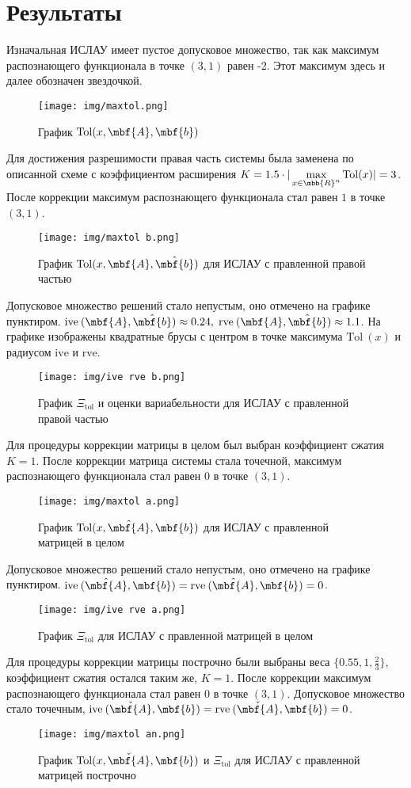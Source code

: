 \documentclass[a4paper]{article}
\begin{document}
\section{Результаты}
Изначальная ИСЛАУ имеет пустое допусковое множество, так как максимум распознающего функционала в точке $(3,1)$ равен -2. Этот максимум здесь и далее обозначен звездочкой.
\begin{figure}[H]
    \centering
    \texttt{[image: img/maxtol.png]}
    \caption{График $\mathrm{Tol}(x,\mbf{A},\mbf{b})$}
    \label{fig:origtol}
\end{figure}
Для достижения разрешимости правая часть системы была заменена по описанной схеме с коэффициентом расширения  $K=1.5\cdot|\max\limits_{x\in\mbb{R}^n}\mathrm{Tol}(x)|=3$. После коррекции максимум распознающего функционала стал равен $1$ в точке $(3,1)$.
\begin{figure}[H]
    \centering
    \texttt{[image: img/maxtol b.png]}
    \caption{График $\mathrm{Tol}(x,\mbf{A}, \hat{\mbf{b}})$ для ИСЛАУ с правленной правой частью}
    \label{fig:btol}
\end{figure}
Допусковое множество решений стало непустым, оно отмечено на графике пунктиром. $\mathrm{ive}\:(\mbf{A}, \hat{\mbf{b}})\approx0.24,\;\mathrm{rve}\:(\mbf{A}, \hat{\mbf{b}})\approx1.1$. На графике изображены квадратные брусы с центром в точке максимума $\mathrm{Tol}\:(x)$ и радиусом $\mathrm{ive}$ и $\mathrm{rve}$.
\begin{figure}[H]
    \centering
    \texttt{[image: img/ive rve b.png]}
    \caption{График $\Xi_{\mathrm{tol}}$ и оценки вариабельности для ИСЛАУ с правленной правой частью}
    \label{fig:biverve}
\end{figure}
Для процедуры коррекции матрицы в целом был выбран коэффициент сжатия $K=1$. После коррекции матрица системы стала точечной, максимум распознающего функционала стал равен $0$ в точке $(3,1)$.
\begin{figure}[H]
    \centering
    \texttt{[image: img/maxtol a.png]}
    \caption{График $\mathrm{Tol}(x,\hat{\mbf{A}}, \mbf{b})$ для ИСЛАУ с правленной матрицей в целом}
    \label{fig:atol}
\end{figure}
Допусковое множество решений стало непустым, оно отмечено на графике пунктиром. $\mathrm{ive}\:(\hat{\mbf{A}}, \mbf{b})=\mathrm{rve}\:(\hat{\mbf{A}}, \mbf{b})=0$. 
\begin{figure}[H]
    \centering
    \texttt{[image: img/ive rve a.png]}
    \caption{График $\Xi_{\mathrm{tol}}$ для ИСЛАУ с правленной матрицей в целом}
    \label{fig:aiverve}
\end{figure}
Для процедуры коррекции матрицы построчно были выбраны веса $\{0.55, 1, \frac{2}{3}\}$, коэффициент сжатия остался таким же, $K=1$. После коррекции максимум распознающего функционала стал равен $0$ в точке $(3,1)$. Допусковое множество стало точечным, $\mathrm{ive}\:(\check{\mbf{A}}, \mbf{b})=\mathrm{rve}\:(\check{\mbf{A}}, \mbf{b})=0$.
\begin{figure}[H]
    \centering
    \texttt{[image: img/maxtol an.png]}
    \caption{График $\mathrm{Tol}(x,\check{\mbf{A}}, \mbf{b})$ и $\Xi_{\mathrm{tol}}$ для ИСЛАУ с правленной матрицей построчно}
    \label{fig:aniverve}
\end{figure}
\end{document}
